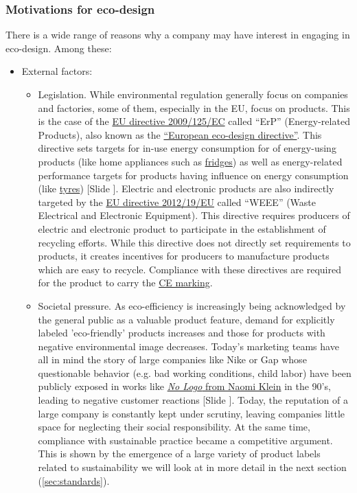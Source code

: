\documentclass{article}
\newcounter{slide}
\begin{document}
\subsubsection{Motivations for eco-design}
\label{sec:motivations}
There is a wide range of reasons why a company may have interest in engaging in eco-design. Among these:
\begin{itemize}
	\item External factors:
	\begin{itemize}
		\item Legislation. While environmental regulation generally focus on companies and factories, some of them, especially in the EU, focus on products. This is the case of the \href{https://eur-lex.europa.eu/legal-content/EN/ALL/?uri=CELEX:32009L0125}{EU directive 2009/125/EC} called ``ErP'' (Energy-related Products), also known as the \href{https://en.wikipedia.org/wiki/European_Ecodesign_Directive}{``European eco-design directive''}. This directive sets targets for in-use energy consumption for of energy-using products (like home appliances such as \href{https://ec.europa.eu/energy/en/topics/energy-efficiency/energy-efficient-products/fridges-and-freezers}{fridges}) as well as energy-related performance targets for products having influence on energy consumption (like \href{https://ec.europa.eu/energy/en/topics/energy-efficiency/energy-efficient-products/tyres}{tyres}) {\color{blue}[Slide ]}. Electric and electronic products are also indirectly targeted by the \href{https://eur-lex.europa.eu/legal-content/EN/TXT/?uri=CELEX:32012L0019}{EU directive 2012/19/EU} called ``WEEE'' (Waste Electrical and Electronic Equipment). This directive requires producers of electric and electronic product to participate in the establishment of recycling efforts. While this directive does not directly set requirements to products, it creates incentives for producers to manufacture products which are easy to recycle. Compliance with these directives are required for the product to carry the \href{https://en.wikipedia.org/wiki/CE_marking}{CE marking}.
		\item Societal pressure. As eco-efficiency is increasingly being acknowledged by the general public as a valuable product feature, demand for explicitly labeled 'eco-friendly' products increases and those for products with negative environmental image decreases. Today's marketing teams have all in mind the story of large companies like Nike or Gap whose questionable behavior (e.g. bad working conditions, child labor) have been publicly exposed in works like \href{https://en.wikipedia.org/wiki/No_Logo}{\emph{No Logo} from Naomi Klein} in the 90's, leading to negative customer reactions {\color{blue}[Slide ]}. Today, the reputation of a large company is constantly kept under scrutiny, leaving companies little space for neglecting their social responsibility. At the same time, compliance with sustainable practice became a competitive argument. This is shown by the emergence of a large variety of product labels related to sustainability we will look at in more detail in the next section (\ref{sec:standards}).

\end{itemize}
\end{itemize}
\end{document}
